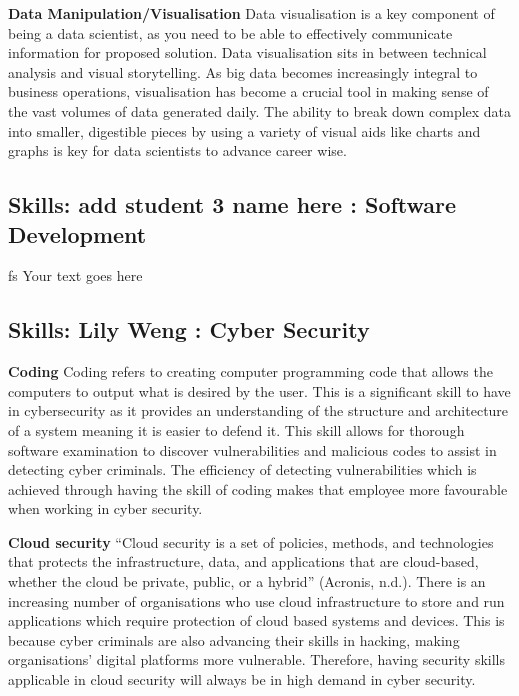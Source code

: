 \documentclass[a4paper, 11pt]{report}
\begin{document}
\textbf{Data Manipulation/Visualisation}
Data visualisation is a key component of being a data scientist, as you need to be able to effectively communicate information for proposed solution.  Data visualisation sits in between technical analysis and visual storytelling. As big data becomes increasingly integral to business operations, visualisation has become a crucial tool in making sense of the vast volumes of data generated daily. The ability to break down complex data into smaller, digestible pieces by using a variety of visual aids like charts and graphs is key for data scientists to advance career wise.



\subsection{Skills: add student 3 name here : Software Development}
fs
Your text goes here

\subsection{Skills: Lily Weng : Cyber Security}

\textbf{Coding}
Coding refers to creating computer programming code that allows the computers to output what is desired by the user. This is a significant skill to have in cybersecurity as it provides an understanding of the structure and architecture of a system meaning it is easier to defend it. This skill allows for thorough software examination to discover vulnerabilities and malicious codes to assist in detecting cyber criminals. The efficiency of detecting vulnerabilities which is achieved through having the skill of coding makes that employee more favourable when working in cyber security.

\textbf{Cloud security}
“Cloud security is a set of policies, methods, and technologies that protects the infrastructure, data, and applications that are cloud-based, whether the cloud be private, public, or a hybrid” (Acronis, n.d.). There is an increasing number of organisations who use cloud infrastructure to store and run applications which require protection of cloud based systems and devices. This is because cyber criminals are also advancing their skills in hacking, making organisations’ digital platforms more vulnerable. Therefore, having security skills applicable in cloud security will always be in high demand in cyber security. 
\end{document}
